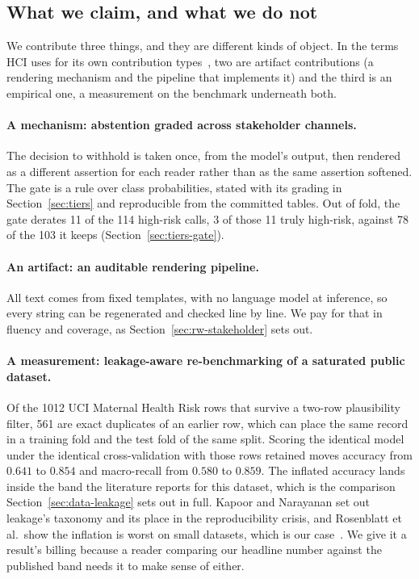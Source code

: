 \subsection{What we claim, and what we do not}

We contribute three things, and they are different kinds of object. In the
terms HCI uses for its own contribution
types~\citep{wobbrock2016contributions}, two are artifact contributions (a
rendering mechanism and the pipeline that implements it) and the third is
an empirical one, a measurement on the benchmark underneath both.

\paragraph{A mechanism: abstention graded across stakeholder channels.}
The decision to withhold is taken once, from the model's output, then rendered
as a different assertion for each reader rather than as the same assertion
softened. The gate is a rule over class probabilities, stated with its grading
in Section~\ref{sec:tiers} and reproducible from the committed tables. Out of
fold, the gate derates 11 of the 114 high-risk calls, 3 of those 11 truly
high-risk, against 78 of the 103 it keeps (Section~\ref{sec:tiers-gate}).

\paragraph{An artifact: an auditable rendering pipeline.} All text comes from
fixed templates, with no language model at inference, so every string can be
regenerated and checked line by line. We pay for that in fluency and coverage, as
Section~\ref{sec:rw-stakeholder} sets out.

\paragraph{A measurement: leakage-aware re-benchmarking of a saturated public
dataset.} Of the 1012 UCI Maternal Health Risk rows that survive a two-row
plausibility filter, 561 are exact duplicates of an earlier row, which can
place the same record in a training fold and the test fold of the same
split. Scoring the identical model under the identical
cross-validation with those rows retained moves accuracy from $0.641$ to
$0.854$ and macro-recall from $0.580$ to $0.859$. The inflated accuracy lands
inside the band the literature reports for this dataset, which is the
comparison Section~\ref{sec:data-leakage} sets out in full. Kapoor and
Narayanan set out leakage's taxonomy and its place in the reproducibility
crisis, and Rosenblatt et al.\ show the inflation is worst on small datasets,
which is our case~\citep{kapoor2023leakage,rosenblatt2024leakage}. We give it
a result's billing because a reader comparing our headline number against the
published band needs it to make sense of either.

